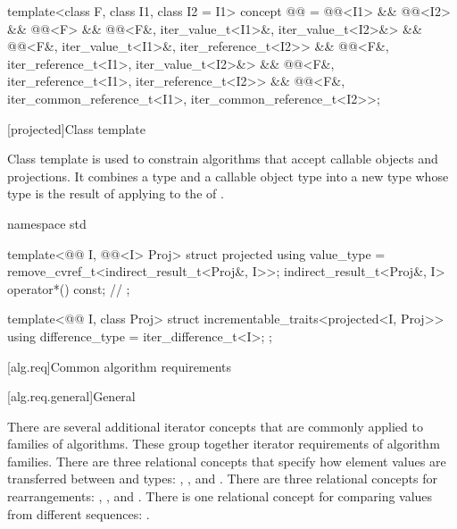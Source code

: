 \begin{codeblock}
{  template<class F, class I1, class I2 = I1>
    concept @@ =
      @@<I1> && @@<I2> &&
      @@<F> &&
      @@<F&, iter_value_t<I1>&, iter_value_t<I2>&> &&
      @@<F&, iter_value_t<I1>&, iter_reference_t<I2>> &&
      @@<F&, iter_reference_t<I1>, iter_value_t<I2>&> &&
      @@<F&, iter_reference_t<I1>, iter_reference_t<I2>> &&
      @@<F&, iter_common_reference_t<I1>, iter_common_reference_t<I2>>;
}
\end{codeblock}

[projected]{Class template }

\pnum
Class template  is used to constrain algorithms
that accept callable objects and projections.
It combines a  type  and
a callable object type  into a new  type
whose  type is the result of applying
 to the  of .

%
\begin{codeblock}
namespace std {
  template<@@ I, @@<I> Proj>
  struct projected {
    using value_type = remove_cvref_t<indirect_result_t<Proj&, I>>;
    indirect_result_t<Proj&, I> operator*() const;              // \notdef
  };

  template<@@ I, class Proj>
  struct incrementable_traits<projected<I, Proj>> {
    using difference_type = iter_difference_t<I>;
  };
}
\end{codeblock}

[alg.req]{Common algorithm requirements}

[alg.req.general]{General}

\pnum
There are several additional iterator concepts that are commonly applied
to families of algorithms. These group together iterator requirements
of algorithm families.
There are three relational concepts that specify
how element values are transferred between
 and  types:
,
, and
.
There are three relational concepts for rearrangements:
,
, and
.
There is one relational concept for comparing values from different sequences:
.

